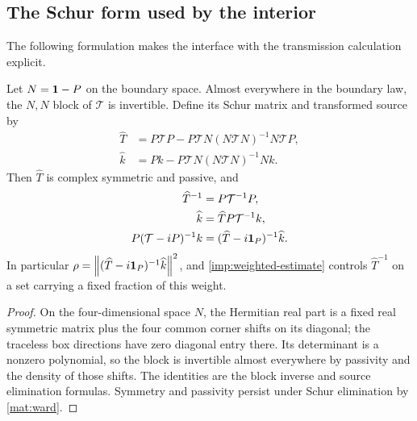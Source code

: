 \subsection{The Schur form used by the interior}

The following formulation makes the interface with the transmission
calculation explicit.

\begin{corollary}
\label{imp:schur-interface}
Let $N=\mathbf 1-P$ on the boundary space. Almost everywhere in the boundary
law, the $N,N$ block of $\mathcal T$ is invertible. Define its Schur
matrix and transformed source by
\begin{align*}
 \widehat T
 &=P\mathcal TP-P\mathcal TN(N\mathcal TN)^{-1}N\mathcal TP,\\
 \widehat k
 &=Pk-P\mathcal TN(N\mathcal TN)^{-1}Nk.
\end{align*}
Then $\widehat T$ is complex symmetric and passive, and
\begin{align*}
 \widehat T^{-1}&=P\mathcal T^{-1}P,\\
 \widehat k&=\widehat T P\mathcal T^{-1}k,\\
 P(\mathcal T-iP)^{-1}k&=(\widehat T-i\mathbf 1_P)^{-1}\widehat k.
\end{align*}
In particular $\rho=\left\lVert(\widehat T-i\mathbf 1_P)^{-1}\widehat k\right\rVert^2$,
and \cref{imp:weighted-estimate} controls $\widehat T^{-1}$ on a set
carrying a fixed fraction of this weight.
\end{corollary}

\begin{proof}
On the four-dimensional space $N$, the Hermitian real part is a fixed
real symmetric matrix plus the four common corner shifts on its
diagonal; the traceless box directions have zero diagonal entry there.
Its determinant is a nonzero polynomial, so the block is invertible
almost everywhere by passivity and the density of those shifts. The
identities are the block inverse and source elimination formulas.
Symmetry and passivity persist under Schur elimination by
\cref{mat:ward}.
\end{proof}
